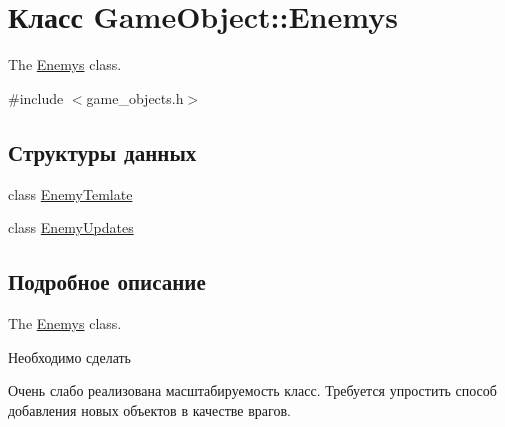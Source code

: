 \hypertarget{classGameObject_1_1Enemys}{}\section{Класс Game\+Object\+:\+:Enemys}
\label{classGameObject_1_1Enemys}


The \hyperlink{classGameObject_1_1Enemys}{Enemys} class.  




{\ttfamily \#include $<$game\+\_\+objects.\+h$>$}

\subsection*{Структуры данных}
\begin{DoxyCompactItemize}
\item 
class \hyperlink{classGameObject_1_1Enemys_1_1EnemyTemlate}{Enemy\+Temlate}
\item 
class \hyperlink{classGameObject_1_1Enemys_1_1EnemyUpdates}{Enemy\+Updates}
\end{DoxyCompactItemize}


\subsection{Подробное описание}
The \hyperlink{classGameObject_1_1Enemys}{Enemys} class. 

\begin{DoxyRefDesc}{Необходимо сделать}
\item[\hyperlink{todo__todo000001}{Необходимо сделать}]Очень слабо реализована масштабируемость класс. Требуется упростить способ добавления новых объектов в качестве врагов. \end{DoxyRefDesc}
